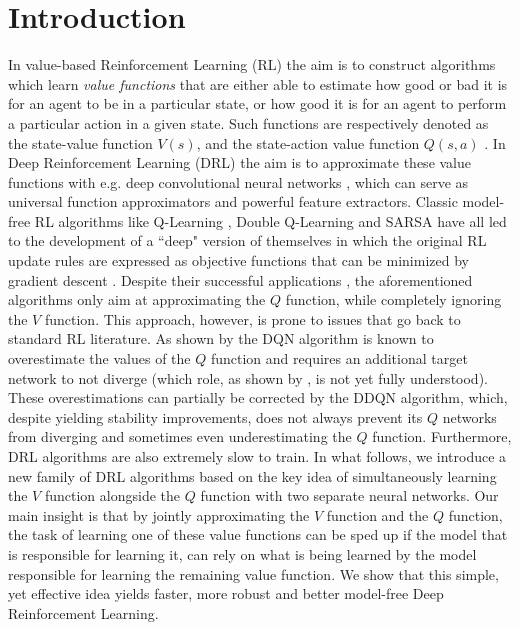 \section{Introduction}
\label{sec:ijcnn_introduction}

In value-based Reinforcement Learning (RL) the aim is to construct algorithms which learn \textit{value functions} that are either able to estimate how good or bad it is for an agent to be in a particular state, or how good it is for an agent to perform a particular action in a given state. Such functions are respectively denoted as the state-value function $V(s)$, and the state-action value function $Q(s,a)$ \cite{sutton2018reinforcement}. In Deep Reinforcement Learning (DRL) the aim is to approximate these value functions with e.g. deep convolutional neural networks \cite{lecun2015deep}, which can serve as universal function approximators and powerful feature extractors. Classic model-free RL algorithms like Q-Learning \cite{watkins1992q}, Double Q-Learning \cite{hasselt2010double} and SARSA \cite{rummery1994line} have all led to the development of a ``deep" version of themselves in which the original RL update rules are expressed as objective functions that can be minimized by gradient descent \cite{mnih2015human, van2016deep, zhao2016deep}. Despite their successful applications \cite{li2017deep}, the aforementioned algorithms only aim at approximating the $Q$ function, while completely ignoring the $V$ function. This approach, however, is prone to issues that go back to standard RL literature. As shown by \citet{van2016deep} the DQN algorithm \cite{mnih2015human} is known to overestimate the values of the $Q$ function and requires an additional target network to not diverge (which role, as shown by \citet{achiam2019towards}, is not yet fully understood). These overestimations can partially be corrected by the DDQN \cite{van2016deep} algorithm, which, despite yielding stability improvements, does not always prevent its $Q$ networks from diverging \cite{van2018deep} and sometimes even underestimating the $Q$ function. Furthermore, DRL algorithms are also extremely slow to train. In what follows, we introduce a new family of DRL algorithms based on the key idea of simultaneously learning the $V$ function alongside the $Q$ function with two separate neural networks. Our main insight is that by jointly approximating the $V$ function and the $Q$ function, the task of learning one of these value functions can be sped up if the model that is responsible for learning it, can rely on what is being learned by the model responsible for learning the remaining value function. We show that this simple, yet effective idea yields faster, more robust and better model-free Deep Reinforcement Learning.

